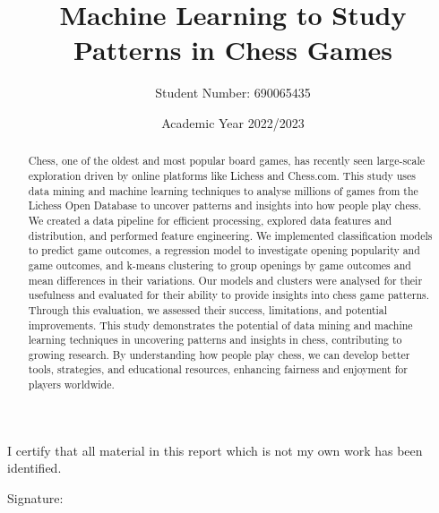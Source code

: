 \documentclass[a4paper, 11pt]{article}
\begin{document}
\title{Machine Learning to Study Patterns in Chess Games}
\author{Student Number: 690065435}
\date{Academic Year 2022/2023}

\maketitle

\newpage
\begin{abstract}
Chess, one of the oldest and most popular board games, has recently seen large-scale exploration driven by online platforms like Lichess and Chess.com. This study uses data mining and machine learning techniques to analyse millions of games from the Lichess Open Database to uncover patterns and insights into how people play chess. We created a data pipeline for efficient processing, explored data features and distribution, and performed feature engineering. We implemented classification models to predict game outcomes, a regression model to investigate opening popularity and game outcomes, and k-means clustering to group openings by game outcomes and mean differences in their variations. Our models and clusters were analysed for their usefulness and evaluated for their ability to provide insights into chess game patterns. Through this evaluation, we assessed their success, limitations, and potential improvements. This study demonstrates the potential of data mining and machine learning techniques in uncovering patterns and insights in chess, contributing to growing research. By understanding how people play chess, we can develop better tools, strategies, and educational resources, enhancing fairness and enjoyment for players worldwide.
    
\begin{center}
\end{center}
\end{abstract}

\vspace*{\fill}
\begin{center}

\vspace{1em}
I certify that all material in this report which is not my own work has been identified.
\end{center}
\vspace{1em}

Signature: \hrulefill

\newpage
\tableofcontents
\newpage
\end{document}
